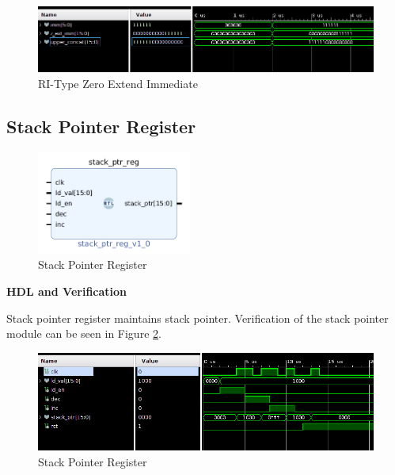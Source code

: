 \documentclass{article}
\newcommand{\stitle}{HDL and Verification}
\begin{document}
\begin{par}
	\begin{figure}[H]
		\centering
		\includegraphics[width=7in]{img/riExtTB.png}
		\caption{RI-Type Zero Extend Immediate}
		\label{fig:ri_imm_tb}
	\end{figure}

	\newpage
	
	\subsection{Stack Pointer Register}
	
	\begin{figure}[H]
		\centering
		\includegraphics[width=2in]{img/stackPtr.png}
		\caption{Stack Pointer Register}
	\end{figure}

	\textbf{\stitle}
	\begin{par}
		Stack pointer register maintains stack pointer. Verification of the stack pointer module can be seen in Figure \ref{fig:stackPtrTB}.
	\end{par}

	\begin{figure}[H]
		\centering
		\includegraphics[width=7in]{img/stackPtrTB.png}
		\caption{Stack Pointer Register}
		\label{fig:stackPtrTB}
	\end{figure}

\end{par}

\newpage
\end{document}

